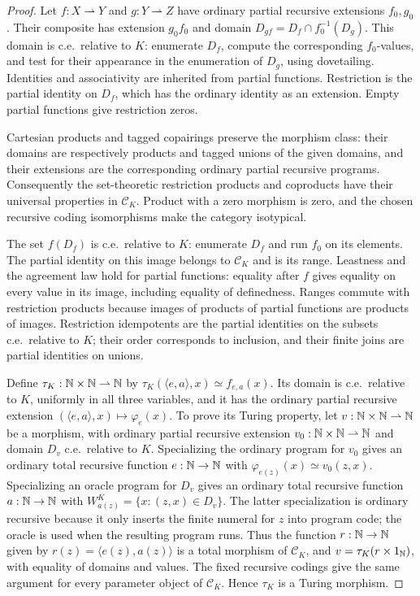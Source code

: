 \begin{proof}
Let $f:X\rightharpoonup Y$ and $g:Y\rightharpoonup Z$ have
ordinary partial recursive extensions $f_0,g_0$. Their composite has
extension $g_0f_0$ and domain $D_{gf}=D_f\cap f_0^{-1}(D_g)$.
This domain is c.e.\ relative to $K$: enumerate $D_f$, compute the
corresponding $f_0$-values, and test for their appearance in the
enumeration of $D_g$, using dovetailing. Identities and associativity
are inherited from partial functions. Restriction is the partial
identity on $D_f$, which has the ordinary identity as an extension.
Empty partial functions give restriction zeros.

Cartesian products and tagged copairings preserve the morphism class:
their domains are respectively products and tagged unions of the given
domains, and their extensions are the corresponding ordinary partial
recursive programs. Consequently the set-theoretic restriction
products and coproducts have their universal properties in
$\mathcal C_K$. Product with a zero morphism is zero, and the chosen
recursive coding isomorphisms make the category isotypical.

The set $f(D_f)$ is c.e.\ relative to $K$: enumerate $D_f$ and run
$f_0$ on its elements. The partial identity on this image belongs to
$\mathcal C_K$ and is its range. Leastness and the agreement law
hold for partial functions: equality after $f$ gives equality on
every value in its image, including equality of definedness.
Ranges commute with restriction products because images of products
of partial functions are products of images. Restriction idempotents
are the partial identities on the subsets c.e.\ relative to $K$;
their order corresponds to inclusion, and their finite joins are
partial identities on unions.

Define $\tau_K:\mathbb N\times\mathbb N\rightharpoonup\mathbb N$ by
$\tau_K(\langle e,a\rangle,x)\simeq f_{e,a}(x)$.
Its domain is c.e.\ relative to $K$, uniformly in all three
variables, and it has the ordinary partial recursive extension
$(\langle e,a\rangle,x)\mapsto\varphi_e(x)$.
To prove its Turing property, let
$v:\mathbb N\times\mathbb N\rightharpoonup\mathbb N$ be a morphism, with ordinary
partial recursive extension $v_0:\mathbb N\times\mathbb N\rightharpoonup\mathbb N$ and
domain $D_v$ c.e.\ relative to $K$. Specializing the ordinary program
for $v_0$ gives an ordinary total recursive function $e:\mathbb N\to\mathbb N$ with
$\varphi_{e(z)}(x)\simeq v_0(z,x)$.
Specializing an oracle program for $D_v$ gives an ordinary total
recursive function $a:\mathbb N\to\mathbb N$ with
$W_{a(z)}^K=\{x:(z,x)\in D_v\}$.
The latter specialization is ordinary recursive because it only
inserts the finite numeral for $z$ into program code; the oracle is
used when the resulting program runs. Thus the function
$r:\mathbb N\to\mathbb N$ given by $r(z)=\langle e(z),a(z)\rangle$ is a total
morphism of $\mathcal C_K$, and
$v=\tau_K(r\times1_{\mathbb N})$, with equality of domains and values.
The fixed recursive codings give the same argument for every parameter
object of $\mathcal C_K$. Hence $\tau_K$ is a Turing morphism.


\end{proof}
